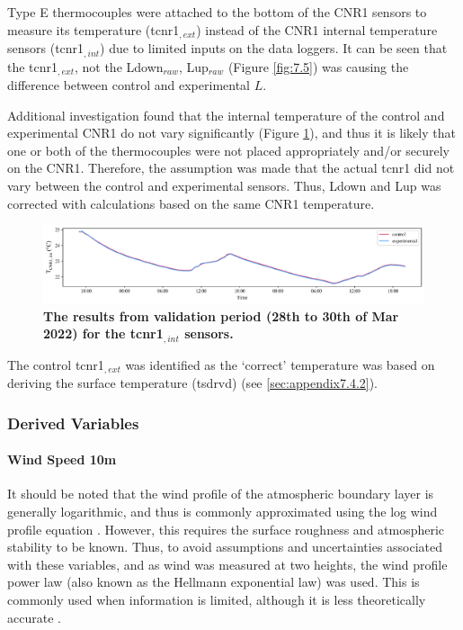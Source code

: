 \documentclass[final,3p,times,authoryear]{elsarticle}
\begin{document}
Type E thermocouples were attached to the bottom of the CNR1 sensors to measure its temperature (\gls{tcnr1}$_{,ext}$) instead of the CNR1 internal temperature sensors (\gls{tcnr1}$_{,int}$) due to limited inputs on the data loggers. It can be seen that the \gls{tcnr1}$_{,ext}$, not the \gls{Ldown}$_{raw}$, \gls{Lup}$_{raw}$ (Figure \ref{fig:7.5}) was causing the difference between control and experimental $L$. 

Additional investigation found that the internal temperature of the control and experimental CNR1 do not vary significantly (Figure \ref{fig:7.6}), and thus it is likely that one or both of the thermocouples were not placed appropriately and/or securely on the CNR1. Therefore, the assumption was made that the actual \gls{tcnr1} did not vary between the control and experimental sensors. Thus, \gls{Ldown} and \gls{Lup} was corrected with calculations based on the same CNR1 temperature.

\begin{figure}
\centering
\includegraphics[trim={0 0 0 0},clip,scale=1.0]{pict022.png}
\caption{\bf The results from validation period (28th to 30th of Mar 2022) for the \gls{tcnr1}$_{,int}$ sensors.}
 \label{fig:7.6}
\end{figure}


The control \gls{tcnr1}$_{,ext}$ was identified as the `correct' temperature was based on deriving the surface temperature (\gls{tsdrvd}) (see \ref{sec:appendix7.4.2}).



\subsubsection{Derived Variables}\label{sec:appendix7.4}
\paragraph{Wind Speed 10m}\label{sec:appendix7.4.1}

It should be noted that the wind profile of the atmospheric boundary layer is generally logarithmic, and thus is commonly approximated using the log wind profile equation \citep{Banuelos-Ruedas2010}. However, this requires the surface roughness and atmospheric stability to be known. Thus, to avoid assumptions and uncertainties associated with these variables, and as wind was measured at two heights, the wind profile power law (also known as the Hellmann exponential law) was used. This is commonly used when information is limited, although it is less theoretically accurate \citep{Banuelos-Ruedas2010}.
\end{document}
